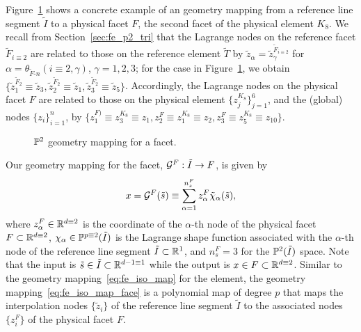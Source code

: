 Figure~\ref{fig:fe_impl_isomap_face_p2} shows a concrete example of an geometry mapping from a reference line segment $\tilde I$ to a physical facet $F$, the second facet of the physical element $K_8$.  We recall from Section~\ref{sec:fe_p2_tri} that the Lagrange nodes on the reference facet $\tilde F_{i \equiv2}$ are related to those on the reference element $\tilde T$ by $\tilde z_\alpha = \tilde z^{\tilde F_{i\equiv 2}}_\gamma$ for $\alpha = \theta_{\tilde F\text{-}n}(i \equiv 2,\gamma)$, $\gamma = 1,2,3$; for the case in Figure~\ref{fig:fe_impl_isomap_face_p2}, we obtain $\{ \tilde z_1^{\tilde F_2} \equiv \tilde z_3, \tilde z_2^{\tilde F_2} \equiv \tilde z_1, \tilde z_3^{\tilde F_2} \equiv \tilde z_5 \}$.  Accordingly, the Lagrange nodes on the physical facet $F$ are related to those on the physical element $\{z^{K_8}_j\}_{j=1}^6$, and the (global) nodes $\{z_i\}_{i=1}^n$,  by $\{z_1^{F)} \equiv z^{K_8}_3 \equiv z_1, z_2^{F} \equiv z^{K_8}_1 \equiv z_2, z_3^{F} \equiv z^{K_8}_5 \equiv z_{10} \}$. 
\begin{figure}
  \centering
  \caption{$\mathbb{P}^2$ geometry mapping for a facet. \label{fig:fe_impl_isomap_face_p2}}
\end{figure}
Our geometry mapping for the facet, $\mathcal{G}^F: \tilde I \to F$, is given by
\begin{equation}
  x = \mathcal{G}^F(\tilde s) \equiv \sum_{\alpha=1}^{n_s^F} z^F_\alpha \tilde \chi_{\alpha}(\tilde s),
  \label{eq:fe_iso_map_face}
\end{equation}
where $z^F_\alpha \in \mathbb{R}^{d \equiv 2}$ is the coordinate of the $\alpha$-th node of the physical facet $F \subset \mathbb{R}^{d \equiv 2}$, $\chi_{\alpha} \in \mathbb{P}^{p \equiv 2}(\tilde I)$ is the Lagrange shape function associated with the $\alpha$-th node of the reference line segment $\tilde I \subset \mathbb{R}^1$, and $n_s^F = 3$ for the $\mathbb{P}^2(\tilde I)$ space.  Note that the input is $\tilde s \in \tilde I \subset \mathbb{R}^{d-1 \equiv 1}$ while the output is $x \in F \subset \mathbb{R}^{d \equiv 2}$.  Similar to the geometry mapping~\eqref{eq:fe_iso_map} for the element, the geometry mapping~\eqref{eq:fe_iso_map_face} is a polynomial map of degree $p$ that maps the interpolation nodes $\{\tilde z_i\}$ of the reference line segment $\tilde I$ to the associated nodes $\{z_i^{F}\}$ of the physical facet $F$.

